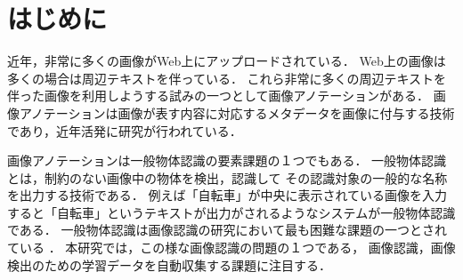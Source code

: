 



\chapter{はじめに}



近年，非常に多くの画像がWeb上にアップロードされている．
Web上の画像は多くの場合は周辺テキストを伴っている．
これら非常に多くの周辺テキストを伴った画像を利用しようする試みの一つとして画像アノテーションがある．
画像アノテーションは画像が表す内容に対応するメタデータを画像に付与する技術であり，近年活発に研究が行われている\cite{jeon,watanabe}．

画像アノテーションは一般物体認識の要素課題の１つでもある．
一般物体認識とは，制約のない画像中の物体を検出，認識して
その認識対象の一般的な名称を出力する技術である．
例えば「自転車」が中央に表示されている画像を入力すると「自転車」というテキストが出力がされるようなシステムが一般物体認識である．
一般物体認識は画像認識の研究において最も困難な課題の一つとされている\cite{yanai}
．
%
%
本研究では，この様な画像認識の問題の１つである，
画像認識，画像検出のための学習データを自動収集する課題に注目する．

